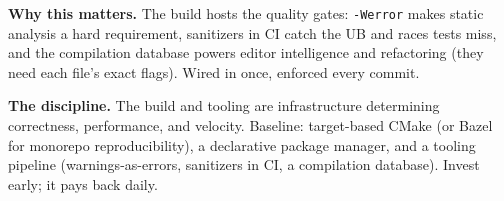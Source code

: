 \textbf{Why this matters.} The build hosts the quality gates: \texttt{-Werror} makes static analysis a hard requirement, sanitizers in CI catch the UB and races tests miss, and the compilation database powers editor intelligence and refactoring (they need each file's exact flags). Wired in once, enforced every commit.

\textbf{The discipline.} The build and tooling are infrastructure determining correctness, performance, and velocity. Baseline: target-based CMake (or Bazel for monorepo reproducibility), a declarative package manager, and a tooling pipeline (warnings-as-errors, sanitizers in CI, a compilation database). Invest early; it pays back daily.
